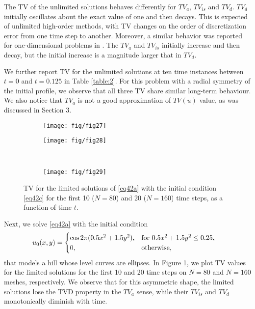 \documentclass[reqno,a4paper,12pt]{amsart}
\begin{document}
The TV of the unlimited solutions behaves differently for $TV_a$, $TV_{is}$ and $TV_d$. $TV_d$ initially oscillates about the exact value of one and then decays. This is expected of unlimited high-order methods, with TV changes on the order of discretization error from one time step to another. Moreover, a similar behavior was reported for one-dimensional problems in \cite{Krivodonova2007}. The $TV_a$ and $TV_{is}$ initially increase and then decay, but the initial increase is a magnitude larger that in $TV_d$.

We further report TV for the unlimited solutions at ten time instances between $t=0$ and $t=0.125$ in Table \ref{table:2}. For this problem with a radial symmetry of the initial profile, we observe that all three TV share similar long-term behaviour. We also notice that $TV_a$ is not a good approximation of $TV(u)$ value, as was discussed in Section 3.   

\begin{figure}[htb!]
\centering
     \begin{subfigure}[b]{0.45\textwidth}
         \centering
         \texttt{[image: fig/fig27]}
     \end{subfigure} \quad
     \begin{subfigure}[b]{0.45\textwidth}
         \centering
         \texttt{[image: fig/fig28]}
     \end{subfigure}
     \hfill\\
          \begin{subfigure}[b]{0.45\textwidth}
         \centering
         \texttt{[image: fig/fig29]}
     \end{subfigure}\hfill
        \caption{TV for the limited solutions of \eqref{eq42a} with the initial condition \eqref{eq42c} for the first 10 ($N = 80$) and 20 ($N = 160$) time steps, as a function of time $t$.}
        \label{fig:3b}
\end{figure}

Next, we solve  \eqref{eq42a} with the initial condition
\begin{align}
    &u_0(x,y) = \begin{cases} \cos{2 \pi (0.5 x^2 + 1.5 y^2)}, & \mbox{for } 0.5 x^2 + 1.5 y^2 \leq 0.25, \\ 0,  & \mbox{otherwise, } \end{cases} \hfill
    \label{eq42c}
\end{align}
that models a hill whose level curves are ellipses. In Figure \ref{fig:3b}, we plot TV values for the limited solutions for the first 10 and 20 time steps on $N = 80$ and $N = 160$ meshes, respectively. We observe that for this asymmetric shape, the limited solutions lose the TVD property in the $TV_a$ sense, while their $TV_{is}$ and $TV_d$ monotonically diminish with time.
\end{document}
